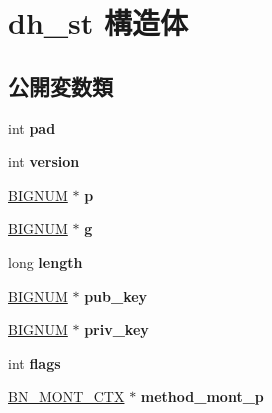 \hypertarget{structdh__st}{}\section{dh\+\_\+st 構造体}
\label{structdh__st}
\subsection*{公開変数類}
\begin{DoxyCompactItemize}
\item 
\hypertarget{structdh__st_aae482b7bef6f43b8299ed2bdd1f658c9}{}int {\bfseries pad}\label{structdh__st_aae482b7bef6f43b8299ed2bdd1f658c9}

\item 
\hypertarget{structdh__st_a661645628bf9785abcb0c7f19946a789}{}int {\bfseries version}\label{structdh__st_a661645628bf9785abcb0c7f19946a789}

\item 
\hypertarget{structdh__st_ad517b332a9e3129370371922b68336b8}{}\hyperlink{structbignum__st}{B\+I\+G\+N\+U\+M} $\ast$ {\bfseries p}\label{structdh__st_ad517b332a9e3129370371922b68336b8}

\item 
\hypertarget{structdh__st_aa4bceea00e97aad49a2fd04b0e552f4f}{}\hyperlink{structbignum__st}{B\+I\+G\+N\+U\+M} $\ast$ {\bfseries g}\label{structdh__st_aa4bceea00e97aad49a2fd04b0e552f4f}

\item 
\hypertarget{structdh__st_ac1a24166e9a30f03bd66fcd8713e560f}{}long {\bfseries length}\label{structdh__st_ac1a24166e9a30f03bd66fcd8713e560f}

\item 
\hypertarget{structdh__st_aad2b90e2aa4a6bea39d10a99bcf88324}{}\hyperlink{structbignum__st}{B\+I\+G\+N\+U\+M} $\ast$ {\bfseries pub\+\_\+key}\label{structdh__st_aad2b90e2aa4a6bea39d10a99bcf88324}

\item 
\hypertarget{structdh__st_a3c4e1fb7d7fb23191ec0c4f1229566e2}{}\hyperlink{structbignum__st}{B\+I\+G\+N\+U\+M} $\ast$ {\bfseries priv\+\_\+key}\label{structdh__st_a3c4e1fb7d7fb23191ec0c4f1229566e2}

\item 
\hypertarget{structdh__st_a6edfd86d7930e5a1c3708f822c9b2680}{}int {\bfseries flags}\label{structdh__st_a6edfd86d7930e5a1c3708f822c9b2680}

\item 
\hypertarget{structdh__st_a2c49ea291e7d1b359a944e3d807a842f}{}\hyperlink{structbn__mont__ctx__st}{B\+N\+\_\+\+M\+O\+N\+T\+\_\+\+C\+T\+X} $\ast$ {\bfseries method\+\_\+mont\+\_\+p}\label{structdh__st_a2c49ea291e7d1b359a944e3d807a842f}


\end{DoxyCompactItemize}
